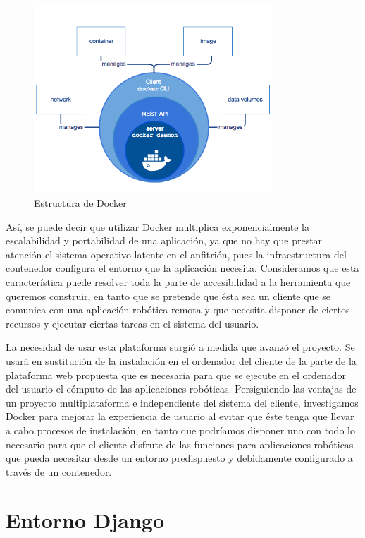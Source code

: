 \begin{figure}[!hbtp]  \centering\noindent
    \includegraphics[width=0.8\textwidth]{figures/docker-engine.png}
    \caption{Estructura de Docker}
    \label{docker}
\end{figure}

Así, se puede decir que utilizar Docker multiplica exponencialmente la escalabilidad y portabilidad de una aplicación, ya que no hay que prestar atención el sistema operativo latente en el anfitrión, pues la infraestructura del contenedor configura el entorno que la aplicación necesita. Consideramos que esta característica puede resolver toda la parte de accesibilidad a la herramienta que queremos construir, en tanto que se pretende que ésta sea un cliente que se comunica con una aplicación robótica remota y que necesita disponer de ciertos recursos y ejecutar ciertas tareas en el sistema del usuario.

La necesidad de usar esta plataforma surgió a medida que avanzó el proyecto. Se usará en sustitución de la instalación en el ordenador del cliente de la parte de la plataforma web propuesta que es necesaria para que se ejecute en el ordenador del usuario el cómputo de las aplicaciones robóticas. Persiguiendo las ventajas de un proyecto multiplataforma e independiente del sistema del cliente, investigamos Docker para mejorar la experiencia de usuario al evitar que éste tenga que llevar a cabo procesos de instalación, en tanto que podríamos disponer uno con todo lo necesario para que el cliente disfrute de las funciones para aplicaciones robóticas que pueda necesitar desde un entorno predispuesto y debidamente configurado a través de un contenedor.

\section{Entorno Django}

